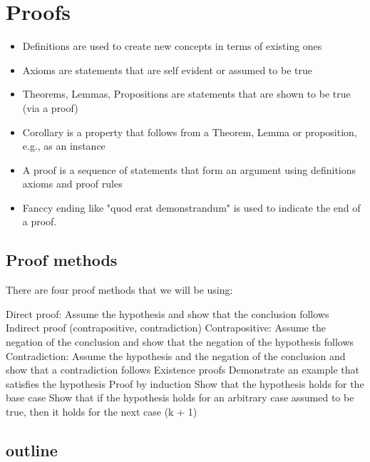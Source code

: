 \documentclass{article}
\begin{document}
\pagebreak

\section{Proofs}

\begin{itemize}
    \item Definitions are used to create new concepts in terms of existing ones
    \item Axioms are statements that are self evident or assumed to be true
    \item Theorems, Lemmas, Propositions are statements that are shown to be true (via a proof)
    \item Corollary is a property that follows from a Theorem, Lemma or proposition, e.g., as an instance
    \item A proof is a sequence of statements that form an argument using definitions axioms and proof rules
    \item Fanccy ending like "quod erat demonstrandum" is used to indicate the end of a proof.
\end{itemize}


\subsection{Proof methods}

There are four proof methods that we will be using:

\begin{outline}
    \1 Direct proof: Assume the hypothesis and show that the conclusion follows
    \1 Indirect proof (contrapositive, contradiction)
    \2 Contrapositive: Assume the negation of the conclusion and show that the negation of the hypothesis follows
    \2 Contradiction: Assume the hypothesis and the negation of the conclusion and show that a contradiction follows
    \1 Existence proofs
    \2 Demonstrate an example that satisfies the hypothesis
    \1 Proof by induction
    \2 Show that the hypothesis holds for the base case
    \2 Show that if the hypothesis holds for an arbitrary case assumed to be true, then it holds for the next case (k + 1)

\end{outline}

\subsection{outline}
\end{document}

